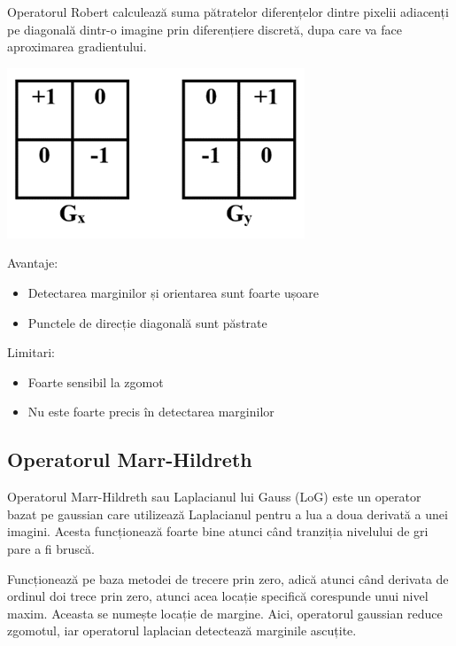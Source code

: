 \documentclass[10pt]{article}
\begin{document}
\> Operatorul Robert calculează suma pătratelor diferențelor dintre pixelii adiacenți pe diagonală dintr-o imagine prin diferențiere discretă,
dupa care va face aproximarea gradientului.
\begin{center}

  \includegraphics[scale=0.5]{robert}
  
\end{center}

\> Avantaje:
\begin{itemize}

  \item Detectarea marginilor și orientarea sunt foarte ușoare
  \item Punctele de direcție diagonală sunt păstrate

\end{itemize}

\> Limitari:
\begin{itemize}

  \item Foarte sensibil la zgomot
  \item Nu este foarte precis în detectarea marginilor
  
\end{itemize}

\newpage



\subsection{Operatorul Marr-Hildreth}

\> Operatorul Marr-Hildreth sau Laplacianul lui Gauss (LoG) este un operator bazat pe gaussian care utilizează Laplacianul
pentru a lua a doua derivată a unei imagini. Acesta funcționează foarte bine atunci când tranziția nivelului de gri pare a fi bruscă.

\> Funcționează pe baza metodei de trecere prin zero, adică atunci când derivata de ordinul doi trece prin zero, atunci acea locație specifică corespunde unui nivel maxim.
Aceasta se numește locație de margine. Aici, operatorul gaussian reduce zgomotul, iar operatorul laplacian detectează marginile ascuțite. 
\end{document}
